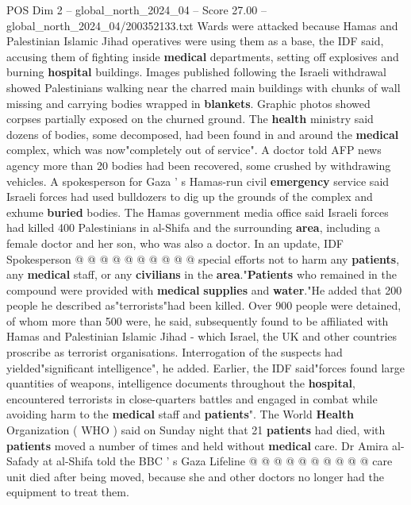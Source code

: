 \begin{textsample}{POS Dim 2 – global\_north\_2024\_04 – Score 27.00 – global\_north\_2024\_04/200352133.txt}  \label{ex:f2_pos_265}
Wards were attacked because Hamas and Palestinian Islamic Jihad operatives were using them as a base, the IDF said, accusing them of fighting inside \textbf{medical} departments, setting off explosives and burning \textbf{hospital} buildings.
Images published following the Israeli withdrawal showed Palestinians walking near the charred main buildings with chunks of wall missing and carrying bodies wrapped in \textbf{blankets}.
Graphic photos showed corpses partially exposed on the churned ground.
The \textbf{health} ministry said dozens of bodies, some decomposed, had been found in and around the \textbf{medical} complex, which was now"completely out of service".
A doctor told AFP news agency more than 20 bodies had been recovered, some crushed by withdrawing vehicles.
A spokesperson for Gaza ' s Hamas-run civil \textbf{emergency} service said Israeli forces had used bulldozers to dig up the grounds of the complex and exhume \textbf{buried} bodies.
The Hamas government media office said Israeli forces had killed 400 Palestinians in al-Shifa and the surrounding \textbf{area}, including a female doctor and her son, who was also a doctor.
In an update, IDF Spokesperson @ @ @ @ @ @ @ @ @ @ special efforts not to harm any \textbf{patients}, any \textbf{medical} staff, or any \textbf{civilians} in the \textbf{area}."\textbf{Patients} who remained in the compound were provided with \textbf{medical} \textbf{supplies} and \textbf{water}."He added that 200 people he described as"terrorists"had been killed.
Over 900 people were detained, of whom more than 500 were, he said, subsequently found to be affiliated with Hamas and Palestinian Islamic Jihad - which Israel, the UK and other countries proscribe as terrorist organisations.
Interrogation of the suspects had yielded"significant intelligence", he added.
Earlier, the IDF said"forces found large quantities of weapons, intelligence documents throughout the \textbf{hospital}, encountered terrorists in close-quarters battles and engaged in combat while avoiding harm to the \textbf{medical} staff and \textbf{patients}".
The World \textbf{Health} Organization ( WHO ) said on Sunday night that 21 \textbf{patients} had died, with \textbf{patients} moved a number of times and held without \textbf{medical} care.
Dr Amira al-Safady at al-Shifa told the BBC ' s Gaza Lifeline @ @ @ @ @ @ @ @ @ @ care unit died after being moved, because she and other doctors no longer had the equipment to treat them.

\end{textsample}
